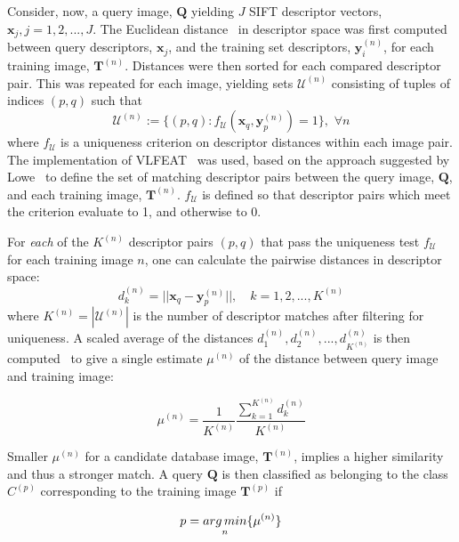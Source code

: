Consider, now, a query image, $\mathbf{Q}$ yielding $J$ SIFT descriptor vectors, $\mathbf{x}_j, j = 1,2,...,J$. The Euclidean distance~\cite{Vedaldi2008} in descriptor space was first computed between query descriptors, $\mathbf{x}_j$, and the training set descriptors, $\mathbf{y}_i^{(n)}$, for each training image, $\mathbf{T}^{(n)}$. Distances were then sorted for each compared descriptor pair.  This was repeated for each image, yielding sets $\mathcal{U}^{(n)}$ consisting of tuples of indices $(p,q)$ such that
\[
\mathcal{U}^{(n)} := \lbrace (p,q): f_\mathcal{U}(\mathbf{x}_q,\mathbf{y}_p^{(n)})=1\rbrace,\,\,\forall n
\]
where $f_{\mathcal{U}}$ is a uniqueness criterion on descriptor distances within each image pair. The implementation of VLFEAT~\cite{Vedaldi2008} was used, based on the approach suggested by Lowe~\cite{lowe2004distinctive} to define the set of matching descriptor pairs between the query image, $\mathbf{Q}$, and each training image, $\mathbf{T}^{(n)}$. $f_{\mathcal{U}}$ is defined so that descriptor pairs which meet the criterion evaluate to 1, and otherwise to 0. 

For \textit{each} of the $K^{(n)}$ descriptor pairs $(p,q)$ that pass the uniqueness test $f_{\mathcal{U}}$ for each training image $n$, one can calculate the pairwise distances in descriptor space:
\begin{equation}
d_k^{(n)} =  ||\mathbf{x}_q-\mathbf{y}_p^{(n)}||, \quad k = 1,2,...,K^{(n)}
\label{EucDistance}
\end{equation}
where $K^{(n)} = |\mathcal{U}^{(n)}|$ is the number of descriptor matches after filtering for uniqueness. A scaled average of the distances $d_1^{(n)},d_2^{(n)},...,d_{K^{(n)}}^{(n)}$ is then computed~\cite{Li2009} to give a single estimate $\mu^{(n)}$ of the distance between query image and training image:

\begin{equation}
\mu^{(n)} = \frac{1}{K^{(n)}}\frac{\sum_{k=1}^{K^{(n)}} d_k^{(n)}}{K^{(n)}}
\label{eqScore}
\end{equation}

Smaller $\mu^{(n)}$ for a candidate database image, $\mathbf{T}^{(n)}$, implies a higher similarity and thus a stronger match.
A query $\textbf{Q}$ is then classified as belonging to the class $C^{(p)}$ corresponding to the training image $\mathbf{T}^{(p)}$ if

\begin{equation}
p = \underset{n}{arg\,min}\lbrace \mu^{(n)}\rbrace
\end{equation}

